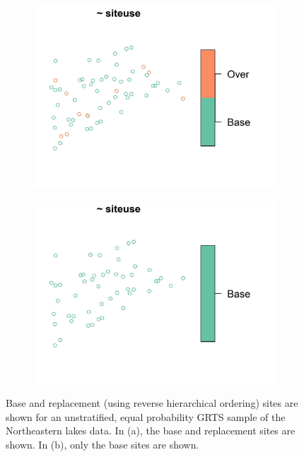 \documentclass[
  shortnames]{jss}
\begin{document}
\begin{figure}
\centering
\begin{subfigure}{0.49\textwidth}
  \centering
  \includegraphics[width = 1\linewidth]{images/base_over.jpeg}
  \caption{}
  \label{fig:base_over}
\end{subfigure}
\begin{subfigure}{0.49\textwidth}
  \centering
  \includegraphics[width = 1\linewidth]{images/base.jpeg}
  \caption{}
  \label{fig:base}
\end{subfigure} 
\caption{Base and replacement (using reverse hierarchical ordering) sites are shown for an unstratified, equal probability GRTS sample of the Northeastern lakes data. In (a), the base and replacement sites are shown. In (b), only the base sites are shown.}
\label{fig:base_and_over}
\end{figure}
\end{document}
